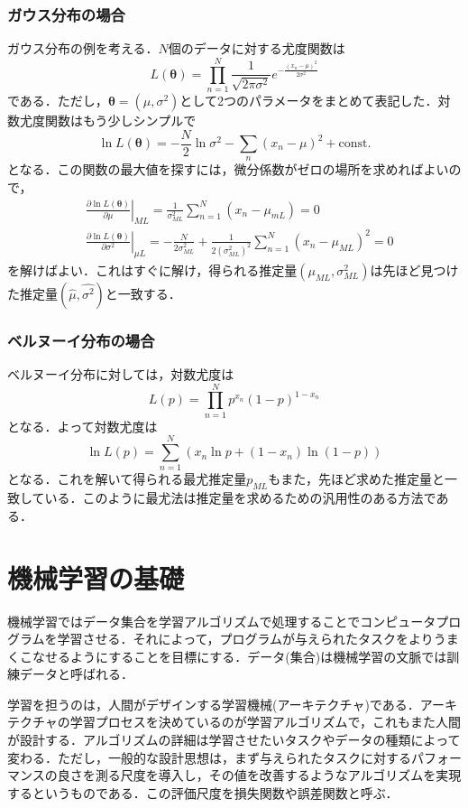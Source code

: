 \documentclass[a4paper,11pt]{jsreport}
\begin{document}
\subsubsection{ガウス分布の場合}
ガウス分布の例を考える．$N$個のデータに対する尤度関数は
\begin{equation}
  L(\bm{\theta})
  = \prod_{n=1}^N \frac{1}{\sqrt{2 \pi \sigma^2}} e^{-\frac{(x_n - \mu)^2}{2 \sigma^2}}
\end{equation}
である．ただし，$\bm{\theta} = (\mu, \sigma^2)$として2つのパラメータをまとめて表記した．対数尤度関数はもう少しシンプルで
\begin{equation}
  \ln{L(\bm{\theta})}
  = -\frac{N}{2} \ln{\sigma^2} - \sum_{n} (x_n - \mu)^2 + \text{const.}
\end{equation}
となる．この関数の最大値を探すには，微分係数がゼロの場所を求めればよいので，
\begin{align}
& \left.\frac{\partial \ln L(\bm{\theta})}{\partial \mu}\right|_{M L}
= \frac{1}{\sigma_{M L}^2} \sum_{n=1}^N\left(x_n-\mu_{m L}\right) = 0 \\
& \left.\frac{\partial \ln L(\bm{\theta})}{\partial \sigma^2}\right|_{\mu L}
= -\frac{N}{2 \sigma_{M L}^2}+\frac{1}{2\left(\sigma_{M L}^2\right)^2} \sum_{n=1}^N\left(x_n-\mu_{M L}\right)^2 = 0
\end{align}
を解けばよい．これはすぐに解け，得られる推定量$(\mu_{ML}, \sigma_{ML}^2)$は先ほど見つけた推定量$(\hat{\mu}, \hat{\sigma^2})$と一致する．

\subsubsection{ベルヌーイ分布の場合}
ベルヌーイ分布に対しては，対数尤度は
\begin{equation}
  L(p) = \prod_{n=1}^{N} p^{x_n} (1 - p)^{1 - x_n}
\end{equation}
となる．よって対数尤度は
\begin{equation}
  \ln{L(p)} = \sum_{n=1}^{N} (x_n \ln{p} + (1 - x_n)\ln{(1 - p)})
\end{equation}
となる．これを解いて得られる最尤推定量$p_{ML}$もまた，先ほど求めた推定量と一致している．このように最尤法は推定量を求めるための汎用性のある方法である．

\section{機械学習の基礎}
機械学習ではデータ集合を学習アルゴリズムで処理することでコンピュータプログラムを学習させる．それによって，プログラムが与えられたタスクをよりうまくこなせるようにすることを目標にする．データ(集合)は機械学習の文脈では訓練データと呼ばれる．\par
学習を担うのは，人間がデザインする学習機械(アーキテクチャ)である．アーキテクチャの学習プロセスを決めているのが学習アルゴリズムで，これもまた人間が設計する．アルゴリズムの詳細は学習させたいタスクやデータの種類によって変わる．ただし，一般的な設計思想は，まず与えられたタスクに対するパフォーマンスの良さを測る尺度を導入し，その値を改善するようなアルゴリズムを実現するというものである．この評価尺度を損失関数や誤差関数と呼ぶ．
\end{document}

